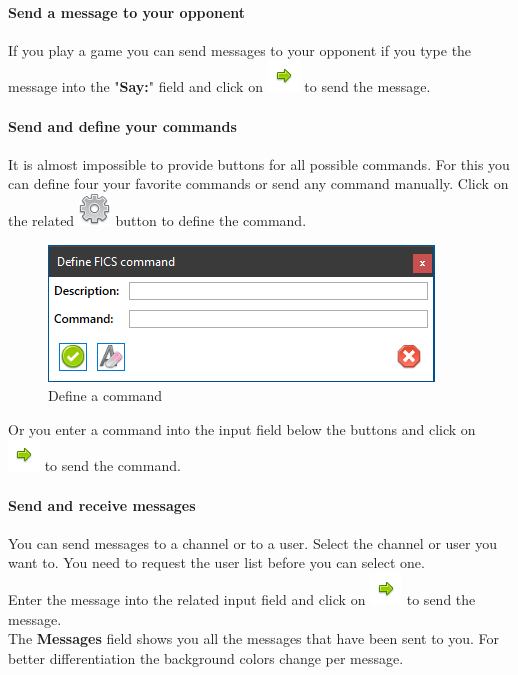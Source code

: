 \documentclass[11pt,a4paper]{article}
\begin{document}
\paragraph{Send a message to your opponent}
If you play a game you can send messages to your opponent if you type the message into the "\textbf{Say:}" field and click on \includegraphics[scale=0.5]{bullet_go.png} to send the message.\\


\paragraph{Send and define your commands}
It is almost impossible to provide buttons for all possible commands. For this you can define four your favorite commands or send any command manually.
Click on the related \includegraphics[scale=0.3]{cog.png} button to define the command.
\begin{figure}[H]
	\centering
	\includegraphics[scale=1.0]{fics5.png}
	\caption{Define a command}
	\label{fig:ficsDefimeCpommand}
\end{figure}

Or you enter a command into the input field below the buttons and click on \includegraphics[scale=0.5]{bullet_go.png} to send the command.

\paragraph{Send and receive messages}
You can send messages to a channel or to a user. Select the channel or user you want to.
You need to request the user list before you can select one.\\
Enter the message into the related input field and click on \includegraphics[scale=0.5]{bullet_go.png} to send the message.\\
The \textbf{Messages} field shows you all the messages that have been sent to you. For better differentiation the background colors change per message.
\end{document}
